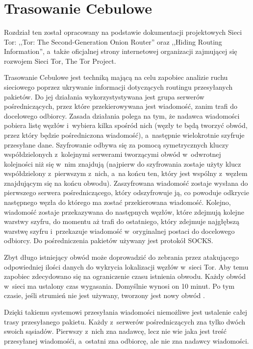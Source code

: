 \section{Trasowanie Cebulowe}\paragraph{}
Rozdział ten został opracowany na podstawie dokumentacji projektowych Sieci Tor: ,,Tor: The Second-Generation Onion Router'' oraz ,,Hiding Routing Information'', a~także oficjalnej strony internetowej organizacji zajmującej się rozwojem Sieci Tor, The Tor Project.

Trasowanie Cebulowe jest techniką mającą na celu zapobiec analizie ruchu sieciowego poprzez ukrywanie informacji dotyczących routingu przesyłanych pakietów. Do jej działania wykorzystystywana jest grupa serwerów pośredniczących, przez które przekierowywana jest wiadomość, zanim trafi do docelowego odbiorcy. Zasada działania polega na tym, że nadawca wiadomości pobiera listę węzłów i~wybiera kilka spośród nich (węzły te będą tworzyć obwód, przez który będzie pośredniczona wiadomość), a~następnie wielokrotnie szyfruje  przesyłane dane. Szyfrowanie odbywa się za pomocą symetrycznych kluczy współdzielonych z~kolejnymi serwerami tworzącymi obwód w~odwrotnej kolejności niż się w~nim znajdują (najpierw do szyfrowania zostaje użyty klucz współdzielony z~pierwszym z~nich, a~na końcu ten, który jest wspólny z~węzłem znajdującym się na końcu obwodu). Zaszyfrowana wiadomość zostaje wysłana do pierwszego serwera pośredniczącego, który odszyfrowuje ją, co powoduje odkrycie następnego węzła do którego ma zostać przekierowana wiadomość. Kolejno, wiadomość zostaje przekazywana do następnych węzłów, które zdejmują kolejne warstwy szyfru, do momentu aż trafi do ostatniego, który zdejmuje najgłębszą warstwę szyfru i~przekazuje wiadomość w~oryginalnej postaci do docelowego odbiorcy. Do pośredniczenia pakietów używany jest protokół SOCKS.

Zbyt długo istniejący obwód może doprowadzić do zebrania przez atakującego odpowiedniej ilości danych do wykrycia lokalizacji węzłów w~sieci Tor. Aby temu zapobiec zdecydowano się na ograniczenie czasu istnienia obwodu. Każdy obwód w~sieci ma ustalony czas wygasania. Domyślnie wynosi on 10 minut. Po tym czasie, jeśli strumień nie jest używany, tworzony jest nowy obwód \cite{tor_manual}.

Dzięki takiemu systemowi przesyłania wiadomości niemożliwe jest ustalenie całej trasy przesyłanego pakietu. Każdy z~serwerów pośredniczących zna tylko dwóch swoich sąsiadów. Pierwszy z~nich zna nadawcę, lecz nie wie jaka jest treść przesyłanej wiadomośći, a~ostatni zna odbiorcę, ale nie zna nadawcy wiadomości\cite{tor_overview}.

